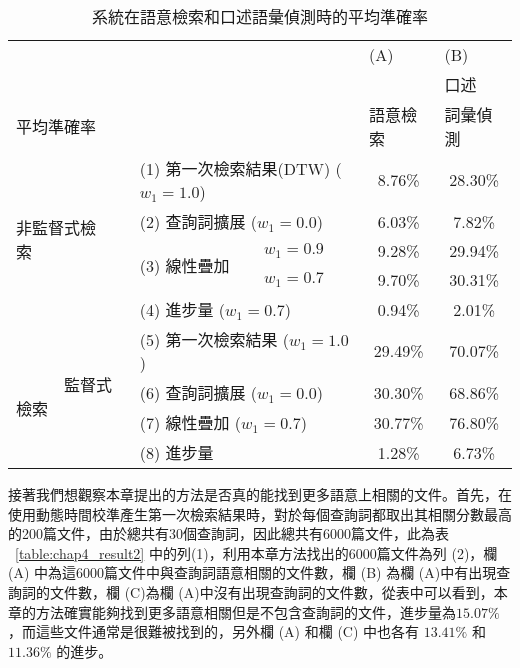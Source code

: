 \begin{table}[htbp]
  \centering    

    \begin{tabular}{|l|l|l|c|c|}
    \hline
    \multicolumn{3}{|l|}{} & \multicolumn{1}{l|}{(A)} & \multicolumn{1}{l|}{(B)} \\
    \multicolumn{3}{|l|}{} & \multicolumn{1}{l|}{} & \multicolumn{1}{l|}{口述} \\
    \multicolumn{3}{|l|}{平均準確率} & \multicolumn{1}{l|}{語意檢索} & \multicolumn{1}{l|}{詞彙偵測} \\
    \hline

    \multirow{5}[2]{*}{\begin{sideways}非監督式檢索~~ \end{sideways}} & \multicolumn{2}{l|}{(1) 第一次檢索結果(DTW) ($w_1=1.0$)} & 8.76\% & 28.30\% \\
    \cline{2-5} 
\cline{4-5}          & \multicolumn{2}{l|}{(2) 查詢詞擴展 ($w_1=0.0$)} & 6.03\% & 7.82\% \\
\cline{2-5}          & \multirow{2}[4]{*}{(3) 線性疊加} & $w_1=0.9$ & 9.28\% & 29.94\% \\
\cline{3-5}          &       & $w_1=0.7$ & 9.70\% & 30.31\% \\
\cline{2-5}          & \multicolumn{2}{l|}{(4) 進步量 ($w_1=0.7$)} & 0.94\% & 2.01\% \\
    \hline
    \multirow{4}[8]{*}{\begin{sideways} ~~~~~~監督式檢索 \end{sideways}} & \multicolumn{2}{l|}{(5) 第一次檢索結果 ($w_1=1.0$)} & 29.49\% & 70.07\% \\
\cline{2-5}          & \multicolumn{2}{l|}{(6) 查詢詞擴展 ($w_1=0.0$)} & 30.30\% & 68.86\% \\
\cline{2-5}          & \multicolumn{2}{l|}{(7) 線性疊加 ($w_1=0.7$)} & 30.77\% & 76.80\% \\
\cline{2-5}          & \multicolumn{2}{l|}{(8) 進步量} & 1.28\% & 6.73\% \\
    \hline
    \end{tabular}%

  \caption{系統在語意檢索和口述語彙偵測時的平均準確率}
  \label{table:chap4_result1}%

\end{table}%

接著我們想觀察本章提出的方法是否真的能找到更多語意上相關的文件。首先，在使用動態時間校準產生第一次檢索結果時，對於每個查詢詞都取出其相關分數最高的200篇文件，由於總共有30個查詢詞，因此總共有6000篇文件，此為表 ~\ref{table:chap4_result2} 中的列(1)，利用本章方法找出的6000篇文件為列 (2)，欄 (A) 中為這6000篇文件中與查詢詞語意相關的文件數，欄 (B) 為欄 (A)中有出現查詢詞的文件數，欄 (C)為欄 (A)中沒有出現查詢詞的文件數，從表中可以看到，本章的方法確實能夠找到更多語意相關但是不包含查詢詞的文件，進步量為$15.07\%$，而這些文件通常是很難被找到的，另外欄 (A) 和欄 (C) 中也各有 $13.41\%$ 和 $11.36\%$ 的進步。

